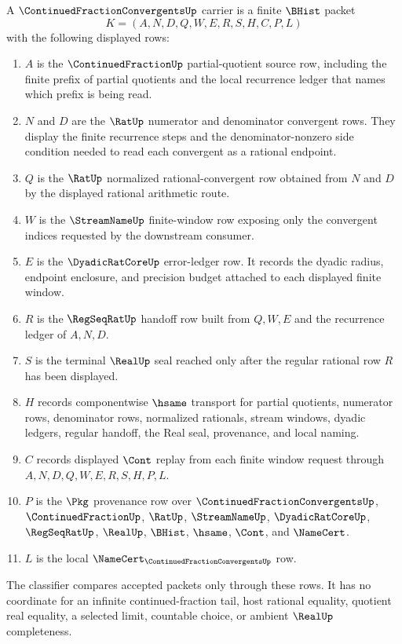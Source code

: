 \begin{definition}
\label{def:continued-fraction-convergent-carrier}
A $\ContinuedFractionConvergentsUp$ carrier is a finite $\BHist$ packet
$$
K=(A,N,D,Q,W,E,R,S,H,C,P,L)
$$
with the following displayed rows:
\begin{enumerate}
\item $A$ is the $\ContinuedFractionUp$ partial-quotient source row, including
the finite prefix of partial quotients and the local recurrence ledger that
names which prefix is being read.
\item $N$ and $D$ are the $\RatUp$ numerator and denominator convergent rows.
They display the finite recurrence steps and the denominator-nonzero side
condition needed to read each convergent as a rational endpoint.
\item $Q$ is the $\RatUp$ normalized rational-convergent row obtained from
$N$ and $D$ by the displayed rational arithmetic route.
\item $W$ is the $\StreamNameUp$ finite-window row exposing only the
convergent indices requested by the downstream consumer.
\item $E$ is the $\DyadicRatCoreUp$ error-ledger row. It records the dyadic
radius, endpoint enclosure, and precision budget attached to each displayed
finite window.
\item $R$ is the $\RegSeqRatUp$ handoff row built from $Q,W,E$ and the
recurrence ledger of $A,N,D$.
\item $S$ is the terminal $\RealUp$ seal reached only after the regular
rational row $R$ has been displayed.
\item $H$ records componentwise $\hsame$ transport for partial quotients,
numerator rows, denominator rows, normalized rationals, stream windows,
dyadic ledgers, regular handoff, the Real seal, provenance, and local naming.
\item $C$ records displayed $\Cont$ replay from each finite window request
through $A,N,D,Q,W,E,R,S,H,P,L$.
\item $P$ is the $\Pkg$ provenance row over
$\ContinuedFractionConvergentsUp$, $\ContinuedFractionUp$, $\RatUp$,
$\StreamNameUp$, $\DyadicRatCoreUp$, $\RegSeqRatUp$, $\RealUp$, $\BHist$,
$\hsame$, $\Cont$, and $\NameCert$.
\item $L$ is the local $\NameCert_{\ContinuedFractionConvergentsUp}$ row.
\end{enumerate}
The classifier compares accepted packets only through these rows. It has no
coordinate for an infinite continued-fraction tail, host rational equality,
quotient real equality, a selected limit, countable choice, or ambient
$\RealUp$ completeness.
\end{definition}

